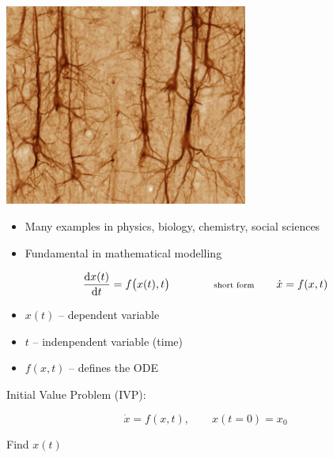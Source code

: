 \begin{frame}
\begin{minipage}{0.48\textwidth}
\begin{center}
  \includegraphics[draft=false,width=0.6\textwidth]{neuron.jpg}
 \end{center}
\end{minipage}

\vspace{2ex}

\begin{itemize}
 \item Many examples in physics, biology, chemistry, social sciences
 \item Fundamental in mathematical modelling
\end{itemize}

\end{frame}



\begin{frame}
 

 $$\frac{\mbox{d} x(t)}{\mbox{d} t} = f\big(x(t) , t\big) \qquad \qquad {\scriptsize \text{short form}} \qquad \dot{x} = f(x,t)
$$

 \begin{itemize}
  \item $x(t)$ -- dependent variable
  \item $t$ -- indenpendent variable (time)
  \item $f(x,t)$ -- defines the ODE
 \end{itemize}

\vspace{4ex}

 Initial Value Problem (IVP):

 $$\dot x = f( x , t ) ,\qquad x(t=0) = x_0$$

 \centerline{Find $x(t)$}

\end{frame}


